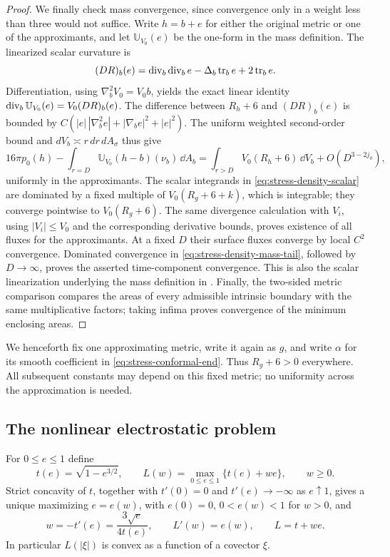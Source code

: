 \begin{proof}
We finally check mass convergence, since convergence only in a weight
less than three would not suffice.  Write $h=b+e$ for either the original
metric or one of the approximants, and let $\mathbb U_{V_0}(e)$ be the
one-form in the mass definition.  The linearized scalar curvature is
\[
 (DR)_b(e)=\operatorname{div}_b\operatorname{div}_b e-\Delta_b\operatorname{tr}_b e+2\operatorname{tr}_b e.
\]
Differentiation, using $\nabla_b^2V_0=V_0b$, yields the exact linear
identity $\operatorname{div}_b\mathbb U_{V_0}(e)=V_0(DR)_b(e)$.
The difference between $R_h+6$ and $(DR)_b(e)$ is bounded by
$C(|e|\,|\nabla_b^2e|+|\nabla_be|^2+|e|^2)$.  The uniform weighted
second-order bound and $dV_b\asymp r\,dr\,dA_\sigma$ thus give
\begin{equation}
 16\pi p_0(h)-\int_{r=D}\mathbb U_{V_0}(h-b)(\nu_b)\,\dd A_b
 =\int_{r>D}V_0(R_h+6)\,\dd V_b+O(D^{3-2j_0}),
 \label{eq:stress-density-mass-tail}
\end{equation}
uniformly in the approximants.  The scalar integrands in
\eqref{eq:stress-density-scalar} are dominated by a fixed multiple of
$V_0(R_g+6+k)$, which is integrable; they converge pointwise to
$V_0(R_g+6)$.  The same divergence calculation with $V_i$, using
$|V_i|\le V_0$ and the corresponding derivative bounds, proves existence
of all fluxes for the approximants.  At a fixed $D$ their surface fluxes
converge by local $C^2$ convergence.  Dominated convergence in
\eqref{eq:stress-density-mass-tail}, followed by $D\to\infty$, proves
the asserted time-component convergence.  This is also the scalar
linearization underlying the mass definition in \citet{CH2003}.
Finally, the two-sided metric comparison compares the areas of every
admissible intrinsic boundary with the same multiplicative factors;
taking infima proves convergence of the minimum enclosing areas.
\end{proof}

We henceforth fix one approximating metric, write it again as $g$, and
write $\alpha$ for its smooth coefficient in
\eqref{eq:stress-conformal-end}.  Thus $R_g+6>0$ everywhere.  All
subsequent constants may depend on this fixed metric; no uniformity
across the approximation is needed.

\subsection{The nonlinear electrostatic problem}

For $0\le e\le1$ define
\begin{equation}
 t(e)=\sqrt{1-e^{3/2}},\qquad
 L(w)=\max_{0\le e\le1}\{t(e)+we\},\qquad w\ge0.
 \label{eq:stress-legendre-law}
\end{equation}
Strict concavity of $t$, together with $t'(0)=0$ and
$t'(e)\to-\infty$ as $e\uparrow1$, gives a unique maximizing $e=e(w)$,
with $e(0)=0$, $0<e(w)<1$ for $w>0$, and
\begin{equation}
 w=-t'(e)=\frac{3\sqrt e}{4t(e)},\qquad
 L'(w)=e(w),\qquad L=t+we.
 \label{eq:stress-constitutive-law}
\end{equation}
In particular $L(|\xi|)$ is convex as a function of a covector $\xi$.

